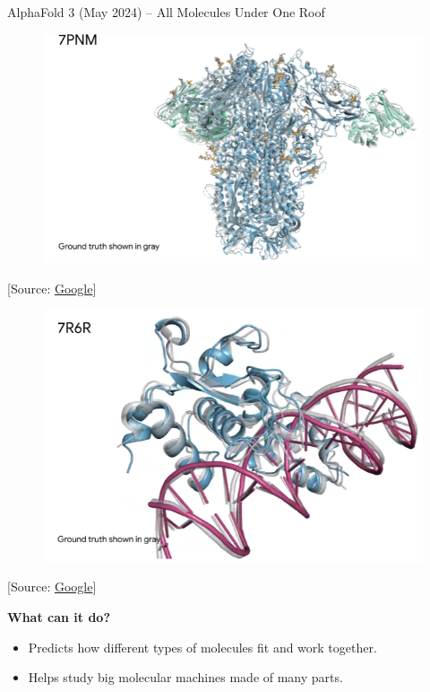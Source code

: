 \begin{frame}[allowframebreaks]{AlphaFold 3 (May 2024) – All Molecules Under One Roof}
    \begin{figure}
        \centering
        \includegraphics[width=\linewidth,height=0.8\textheight,keepaspectratio]{images/science/alphafold-3-protein.png}
    \end{figure}
    [Source: \href{https://blog.google/technology/ai/google-deepmind-isomorphic-alphafold-3-ai-model/}{Google}]

    \framebreak

    \begin{figure}
        \centering
        \includegraphics[width=\linewidth,height=0.8\textheight,keepaspectratio]{images/science/alphafold-3-7r6r.png}
    \end{figure}
    [Source: \href{https://blog.google/technology/ai/google-deepmind-isomorphic-alphafold-3-ai-model/}{Google}]

    \framebreak

    \textbf{What can it do?}
    \begin{itemize}
        \item Predicts how different types of molecules fit and work together.
        \item Helps study big molecular machines made of many parts.
    \end{itemize}


\end{frame}
